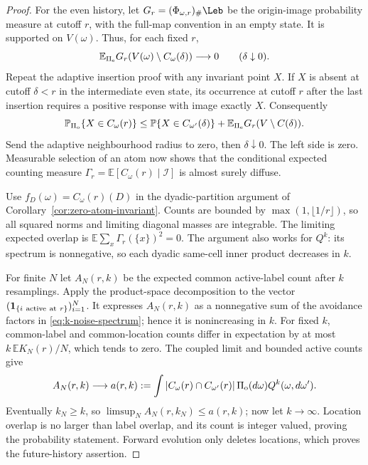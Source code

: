 \documentclass[11pt,letterpaper]{article}
\newcommand{\PP}{\mathbb P}\newcommand{\EE}{\mathbb E}
\newcommand{\ind}{\mathbf 1}\newcommand{\Exp}{\operatorname{Exp}}
\begin{document}
\begin{proof}
For the even history, let $G_r=(\Phi_{\omega,r})_\#\Leb$ be the
origin-image probability measure at cutoff $r$, with the full-map
convention in an empty state. It is supported on $V(\omega)$.
Thus, for each fixed $r$,
\[
 \EE_{\Pi_{\rm e}}G_r(V(\omega)\setminus C_\omega(\delta))
       \longrightarrow0\qquad(\delta\downarrow0).
\]
Repeat the adaptive insertion proof with any invariant point $X$.
If $X$ is absent at cutoff $\delta<r$ in the intermediate even state,
its occurrence at cutoff $r$ after the last insertion requires a
positive response with image exactly $X$.
Consequently
\[
 \PP_{\Pi_{\rm o}}\{X\in C_\omega(r)\}
 \le \PP\{X\in C_{\omega'}(\delta)\}
       +\EE_{\Pi_{\rm e}}G_r(V\setminus C(\delta)).
\]
Send the adaptive neighbourhood radius to zero, then
$\delta\downarrow0$. The left side is zero. Measurable selection of
an atom now shows that the conditional expected counting measure
$\Gamma_r=\EE[C_\omega(r)\mid\mathcal I]$ is almost surely diffuse.

Use $f_D(\omega)=C_\omega(r)(D)$ in the dyadic-partition argument of
Corollary~\ref{cor:zero-atom-invariant}.
Counts are bounded by $\max(1,\lfloor1/r\rfloor)$, so all squared
norms and limiting diagonal masses are integrable. The limiting
expected overlap is $\EE\sum_x\Gamma_r(\{x\})^2=0$.
The argument also works for $Q^k$: its spectrum is nonnegative, so
each dyadic same-cell inner product decreases in $k$.

For finite $N$ let $A_N(r,k)$ be the expected common active-label
count after $k$ resamplings. Apply the product-space decomposition to
the vector $(\ind_{\{i\ {\rm active\ at}\ r\}})_{i=1}^N$.
It expresses $A_N(r,k)$ as a nonnegative sum of the avoidance factors
in \eqref{eq:k-noise-spectrum}; hence it is nonincreasing in $k$.
For fixed $k$, common-label and common-location counts differ in
expectation by at most
$k\,\EE K_N(r)/N$, which tends to zero.
The coupled limit and bounded active counts give
\[
 A_N(r,k)\longrightarrow
 a(r,k):=\int |C_\omega(r)\cap C_{\omega'}(r)|
                 \,\Pi_{\rm o}(d\omega)Q^k(\omega,d\omega').
\]
Eventually $k_N\ge k$, so
$\limsup_N A_N(r,k_N)\le a(r,k)$; now let $k\to\infty$.
Location overlap is no larger than label overlap, and its count is
integer valued, proving the probability statement. Forward evolution
only deletes locations, which proves the future-history assertion.
\end{proof}
\end{document}

